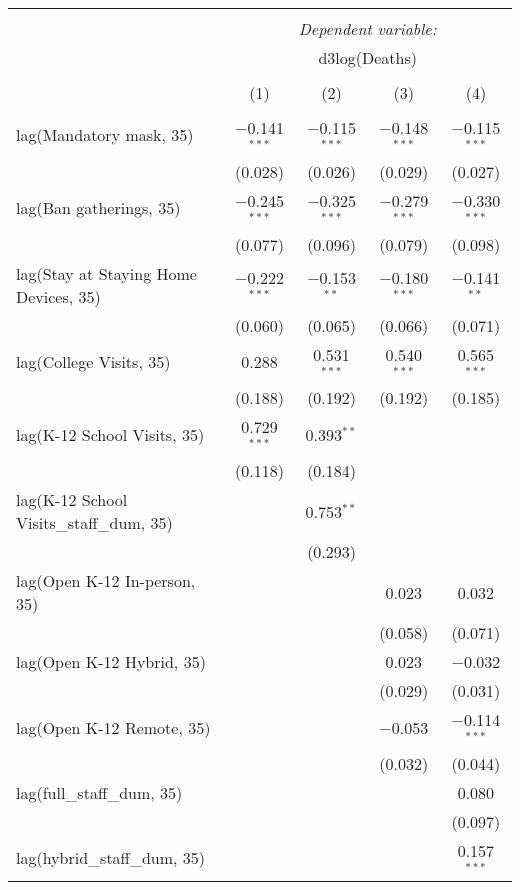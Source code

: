 \begin{tabular}{@{\extracolsep{1pt}}lcccc} 
\\[-1.8ex]\hline 
\hline \\[-1.8ex] 
 & \multicolumn{4}{c}{\textit{Dependent variable:}} \\ 
\cline{2-5} 
 & \multicolumn{4}{c}{d3log(Deaths)} \\ 
\\[-1.8ex] & (1) & (2) & (3) & (4)\\ 
\hline \\[-1.8ex] 
 lag(Mandatory mask, 35) & $-$0.141$^{***}$ & $-$0.115$^{***}$ & $-$0.148$^{***}$ & $-$0.115$^{***}$ \\ 
  & (0.028) & (0.026) & (0.029) & (0.027) \\ 
  lag(Ban gatherings, 35) & $-$0.245$^{***}$ & $-$0.325$^{***}$ & $-$0.279$^{***}$ & $-$0.330$^{***}$ \\ 
  & (0.077) & (0.096) & (0.079) & (0.098) \\ 
  lag(Stay at Staying Home Devices, 35) & $-$0.222$^{***}$ & $-$0.153$^{**}$ & $-$0.180$^{***}$ & $-$0.141$^{**}$ \\ 
  & (0.060) & (0.065) & (0.066) & (0.071) \\ 
  lag(College Visits, 35) & 0.288 & 0.531$^{***}$ & 0.540$^{***}$ & 0.565$^{***}$ \\ 
  & (0.188) & (0.192) & (0.192) & (0.185) \\ 
  lag(K-12 School Visits, 35) & 0.729$^{***}$ & 0.393$^{**}$ &  &  \\ 
  & (0.118) & (0.184) &  &  \\ 
  lag(K-12 School Visits\_staff\_dum, 35) &  & 0.753$^{**}$ &  &  \\ 
  &  & (0.293) &  &  \\ 
  lag(Open K-12 In-person, 35) &  &  & 0.023 & 0.032 \\ 
  &  &  & (0.058) & (0.071) \\ 
  lag(Open K-12 Hybrid, 35) &  &  & 0.023 & $-$0.032 \\ 
  &  &  & (0.029) & (0.031) \\ 
  lag(Open K-12 Remote, 35) &  &  & $-$0.053 & $-$0.114$^{***}$ \\ 
  &  &  & (0.032) & (0.044) \\ 
  lag(full\_staff\_dum, 35) &  &  &  & 0.080 \\ 
  &  &  &  & (0.097) \\ 
  lag(hybrid\_staff\_dum, 35) &  &  &  & 0.157$^{***}$ \\ 

\end{tabular}

